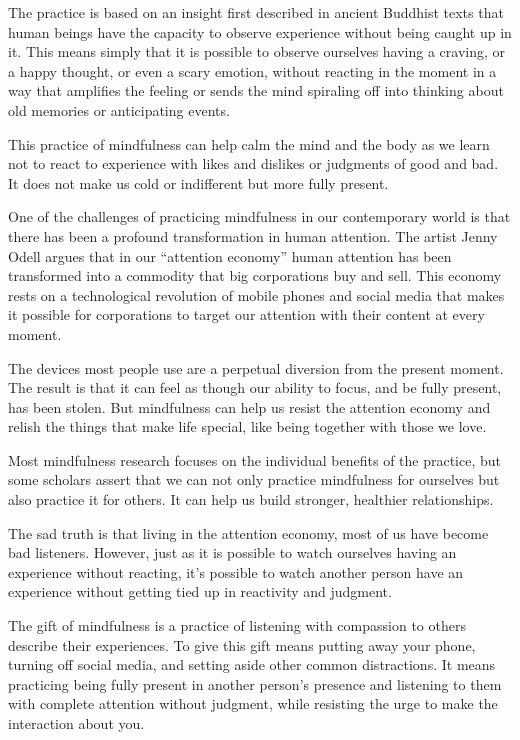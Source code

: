 \documentclass[UTF8,11pt]{ctexart}
\begin{document}
The practice is based on an insight first described in ancient Buddhist texts that human beings have the capacity to observe experience without being caught up in it. This means simply that it is possible to observe ourselves having a craving, or a happy thought, or even a scary emotion, without reacting in the moment in a way that amplifies the feeling or sends the mind spiraling off into thinking about old memories or anticipating events.


This practice of mindfulness can help calm the mind and the body as we learn not to react to experience with likes and dislikes or judgments of good and bad. It does not make us cold or indifferent but more fully present.


One of the challenges of practicing mindfulness in our contemporary world is that there has been a profound transformation in human attention. The artist Jenny Odell argues that in our “attention economy” human attention has been transformed into a commodity that big corporations buy and sell. This economy rests on a technological revolution of mobile phones and social media that makes it possible for corporations to target our attention with their content at every moment.


The devices most people use are a perpetual diversion from the present moment. The result is that it can feel as though our ability to focus, and be fully present, has been stolen. But mindfulness can help us resist the attention economy and relish the things that make life special, like being together with those we love.


Most mindfulness research focuses on the individual benefits of the practice, but some scholars assert that we can not only practice mindfulness for ourselves but also practice it for others. It can help us build stronger, healthier relationships.


The sad truth is that living in the attention economy, most of us have become bad listeners. However, just as it is possible to watch ourselves having an experience without reacting, it’s possible to watch another person have an experience without getting tied up in reactivity and judgment.


The gift of mindfulness is a practice of listening with compassion to others describe their experiences. To give this gift means putting away your phone, turning off social media, and setting aside other common distractions. It means practicing being fully present in another person’s presence and listening to them with complete attention without judgment, while resisting the urge to make the interaction about you.
\end{document}
